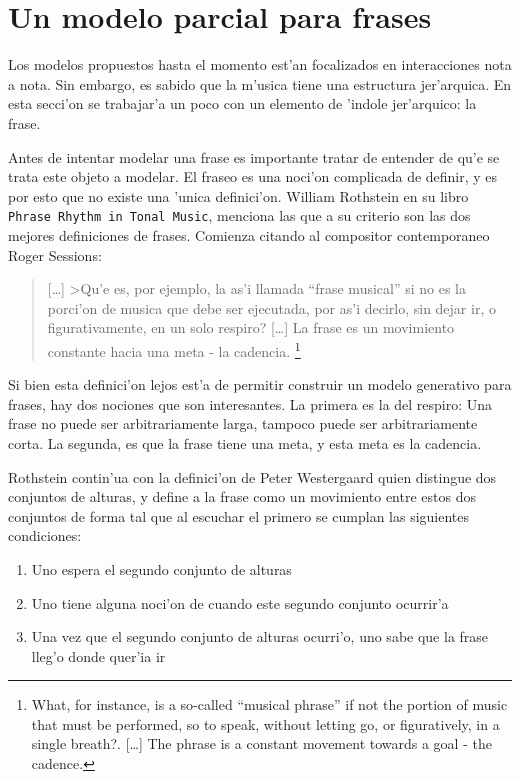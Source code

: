 \section{Un modelo parcial para frases}
\label{sec:phrases}
Los modelos propuestos hasta el momento est'an focalizados en interacciones nota a nota. Sin embargo, es sabido que la m'usica
tiene una estructura jer'arquica. En esta secci'on se trabajar'a un poco con un elemento de 'indole jer'arquico: la frase. 

Antes de intentar modelar una frase es importante tratar de entender de qu'e se trata este objeto a modelar. El fraseo es una
noci'on complicada de definir, y es por esto que no existe una 'unica definici'on. William Rothstein en su libro \texttt{Phrase Rhythm 
in Tonal Music}, menciona las que a su criterio son las dos mejores definiciones de frases. Comienza citando al compositor contemporaneo
Roger Sessions: 

\begin{quote} 
[\ldots] >Qu'e es, por ejemplo, la as'i llamada ``frase musical'' si no es la porci'on de musica que debe ser ejecutada, por as'i decirlo,
sin dejar ir, o figurativamente, en un solo respiro? [\ldots] La frase es un movimiento constante hacia una meta - la cadencia. \footnote{ 
What, for instance, is a so-called ``musical phrase'' if not the portion of music that must be performed, so to speak, 
without letting go, or figuratively, in a single breath?. [\ldots] The phrase is a constant movement towards a goal - the cadence.}
\end{quote}

Si bien esta definici'on lejos est'a de permitir construir un modelo generativo para frases, hay dos nociones que son interesantes. 
La primera es la del respiro: Una frase no puede ser arbitrariamente larga, tampoco puede ser arbitrariamente corta. La 
segunda, es que la frase tiene una meta, y esta meta es la cadencia.%

Rothstein contin'ua con la definici'on de Peter Westergaard quien distingue dos conjuntos de alturas, y define
a la frase como un movimiento entre estos dos conjuntos de forma tal que al escuchar el primero se cumplan las siguientes condiciones:
\begin{enumerate}
 \item Uno espera el segundo conjunto de alturas
 \item Uno tiene alguna noci'on de cuando este segundo conjunto ocurrir'a
 \item Una vez que el segundo conjunto de alturas ocurri'o, uno sabe que la frase lleg'o donde quer'ia ir
\end{enumerate}


